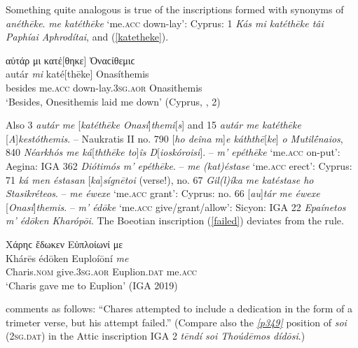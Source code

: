 Something quite analogous is true of the inscriptions formed with synonyms of \textit{anéthēke}. \textit{me katéthēke} `me.\textsc{acc} down-lay': Cyprus: \citet{Deecke1884} 1 \textit{Kás \emph{mi} katéthēke tâi Paphíai Aphrodítai}, and (\ref{katetheke}).

\begin{exe}
\ex αὐτάρ μι κατέ{[}θηκε{]} Ὀναϲίθεμιϲ\\
\gll autár \emph{mi} katé{[}thēke{]} Onasíthemis\\
besides me.\textsc{acc} down-lay.\textsc{3sg.aor} Onasithemis\\
\trans `Besides, Onesithemis laid me down' (Cyprus, \citealp{Deecke1884}, 2)
\label{katetheke}
\end{exe}

Also \citet{Deecke1884} 3 \textit{autár \emph{me}} {[}\textit{katéthēke Onasí}{]}\textit{themi}{[}\textit{s}{]} and 15 \textit{autár \emph{me} katéthēke} {[}\textit{A}{]}\textit{kestóthemis}. -- Naukratis II \citep{Gardner1888} no. 790 {[}\textit{ho deîna \emph{m}}{]}\textit{\emph{e} káththē}{[}\textit{ke}{]} \textit{o Mutilḗnaios}, 840 \textit{Néarkhós \emph{me} ká}{[}\textit{ththēke to}{]}\textit{îs D}{[}\textit{ioskóroisi}{]}. -- \textit{m' epéthēke} `me.\textsc{acc} on-put': Aegina: IGA 362 \textit{Diótimós \emph{m'} epéthēke}. -- \textit{me (kat)éstase} `me.\textsc{acc} erect': Cyprus: \citet{Deecke1884} 71 \textit{ká \emph{men} éstasan} {[}\textit{ka}{]}\textit{sígnētoi} (verse!), \citet[46]{Hoffmann1891} no. 67 \textit{Gil(l)íka \emph{me} katéstase ho Stasikréteos}. -- \textit{me éwexe} `me.\textsc{acc} grant': Cyprus: \citet[46]{Hoffmann1891} no. 66 {[}\textit{au}{]}\textit{tár \emph{me} éwexe} {[}\textit{Onasí}{]}\textit{themis}. -- \textit{m' édōke} `me.\textsc{acc} give/grant/allow': Sicyon: IGA 22 \textit{Epaínetos \emph{m'} édōken Kharópōi}. The Boeotian inscription (\ref{failed}) deviates from the rule.

\begin{exe}
\ex Χάρηϲ ἔδωκεν Εὐπλοίωνί με\\
\gll Khárēs édōken Euploíōní \emph{me}\\
Charis.\textsc{nom} give.\textsc{3sg.aor} Euplion.\textsc{dat} me.\textsc{acc}\\
\trans `Charis gave me to Euplion' (IGA 2019)
\label{failed}
\end{exe}

\citet[56]{Roehl1882} comments as follows: ``Chares attempted to include a dedication in the form of a trimeter verse, but his attempt failed.'' (Compare also the \hyperlink{p349}{\emph{[p349]}} position of \textit{soi} (\textsc{2sg.dat}) in the Attic inscription IGA 2 \textit{tēndí \emph{soi} Thoúdēmos dídōsi}.)

